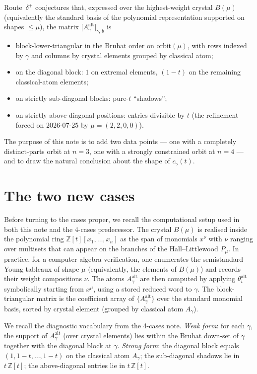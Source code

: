 \documentclass[11pt]{article}
\theoremstyle{definition}
\theoremstyle{remark}
\newcommand{\Aalt}{A^{\mathrm{alt}}}
\newcommand{\thetaalt}{\theta^{\mathrm{alt}}}
\newcommand{\ZZ}{\mathbb{Z}}
\begin{document}
Route~$\delta^+$ conjectures that, expressed over the highest-weight
crystal $B(\mu)$ (equivalently the standard basis of the polynomial
representation supported on shapes $\leq \mu$), the matrix
$\bigl[\Aalt_\gamma\bigr]_{\gamma,\, b}$ is
\begin{itemize}
\item block-lower-triangular in the Bruhat order on
      $\mathrm{orbit}(\mu)$, with rows indexed by $\gamma$ and columns
      by crystal elements grouped by classical atom;
\item on the diagonal block: $1$ on extremal elements,
      $(1-t)$ on the remaining classical-atom elements;
\item on strictly sub-diagonal blocks: pure-$t$ ``shadows'';
\item on strictly above-diagonal positions: entries divisible by $t$
      (the refinement forced on 2026-07-25 by $\mu = (2,2,0,0)$).
\end{itemize}

The purpose of this note is to add two data points --- one with a
completely distinct-parts orbit at $n=3$, one with a strongly
constrained orbit at $n=4$ --- and to draw the natural conclusion
about the shape of $c_\gamma(t)$.

\section{The two new cases}

Before turning to the cases proper, we recall the computational
setup used in both this note and the 4-cases predecessor. The
crystal $B(\mu)$ is realised inside the polynomial ring
$\ZZ[t][x_1, \ldots, x_n]$ as the span of monomials
$x^\nu$ with $\nu$ ranging over multisets that can appear on
the branches of the Hall--Littlewood $P_\mu$. In practice, for a
computer-algebra verification, one enumerates the semistandard
Young tableaux of shape $\mu$ (equivalently, the elements of
$B(\mu)$) and records their weight compositions $\nu$. The atoms
$\Aalt_\gamma$ are then computed by applying $\thetaalt_i$ symbolically
starting from $x^\mu$, using a stored reduced word to $\gamma$.
The block-triangular matrix is the coefficient array of
$\{\Aalt_\gamma\}$ over the standard monomial basis, sorted by
crystal element (grouped by classical atom $A_\gamma$).

We recall the diagnostic vocabulary from the 4-cases note.
\emph{Weak form}: for each $\gamma$, the support of $\Aalt_\gamma$
(over crystal elements) lies within the Bruhat down-set of $\gamma$
together with the diagonal block at $\gamma$. \emph{Strong form}:
the diagonal block equals $(1, 1-t, \ldots, 1-t)$ on the classical
atom $A_\gamma$; the sub-diagonal shadows lie in $t\, \ZZ[t]$;
the above-diagonal entries lie in $t\, \ZZ[t]$.
\end{document}
